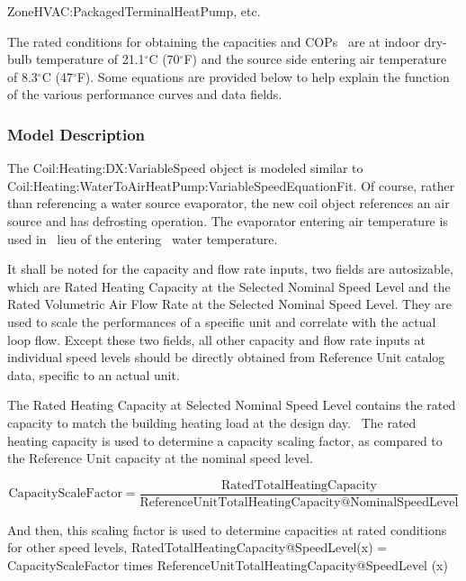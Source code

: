ZoneHVAC:PackagedTerminalHeatPump, etc.

The rated conditions for obtaining the capacities and COPs~ are at indoor dry-bulb temperature of 21.1\(^{\circ}\)C (70\(^{\circ}\)F) and the source side entering air temperature of 8.3\(^{\circ}\)C (47\(^{\circ}\)F). Some equations are provided below to help explain the function of the various performance curves and data fields.

\subsubsection{Model Description}\label{model-description-5}

The Coil:Heating:DX:VariableSpeed object is modeled similar to \\ Coil:Heating:WaterToAirHeatPump:VariableSpeedEquationFit. Of course, rather than referencing a water source evaporator, the new coil object references an air source and has defrosting operation. The evaporator entering air temperature is used in~ lieu of the entering~ water temperature.

It shall be noted for the capacity and flow rate inputs, two fields are autosizable, which are Rated Heating Capacity at the Selected Nominal Speed Level and the Rated Volumetric Air Flow Rate at the Selected Nominal Speed Level. They are used to scale the performances of a specific unit and correlate with the actual loop flow. Except these two fields, all other capacity and flow rate inputs at individual speed levels should be directly obtained from Reference Unit catalog data, specific to an actual unit.

The Rated Heating Capacity at Selected Nominal Speed Level contains the rated capacity to match the building heating load at the design day.~ The rated heating capacity is used to determine a capacity scaling factor, as compared to the Reference Unit capacity at the nominal speed level.

\begin{equation}
{\mathrm{CapacityScaleFactor}} = \frac{{{\mathrm{RatedTotalHeatingCapacity}}}}{{{\mathrm{ReferenceUnitTotalHeatingCapacity}}@{\mathrm{NominalSpeedLevel}}}}
\end{equation}

And then, this scaling factor is used to determine capacities at rated conditions for other speed levels, RatedTotalHeatingCapacity@SpeedLevel(x) = CapacityScaleFactor times ReferenceUnitTotalHeatingCapacity@SpeedLevel (x)

